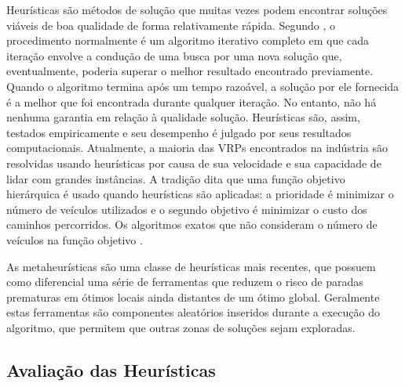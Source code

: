 Heurísticas são métodos de solução que muitas vezes podem encontrar soluções viáveis de boa qualidade de forma relativamente rápida. Segundo \cite{hillier05}, o procedimento normalmente é um algoritmo iterativo completo em que cada iteração envolve a condução de uma busca por uma nova solução que, eventualmente, poderia superar o melhor resultado encontrado previamente. Quando o algoritmo termina após um tempo razoável, a solução por ele fornecida é a melhor que foi encontrada durante qualquer iteração. No entanto, não há nenhuma garantia em relação à qualidade solução. Heurísticas são, assim, testados empiricamente e seu desempenho é julgado por seus resultados computacionais. Atualmente, a maioria das VRPs encontrados na indústria são resolvidas usando heurísticas por causa de sua velocidade e sua capacidade de lidar com grandes instâncias. A tradição dita que uma função objetivo hierárquica é usado quando heurísticas são aplicadas: a prioridade é minimizar o número de veículos utilizados e o segundo objetivo é minimizar o custo dos caminhos percorridos. Os algoritmos exatos que não consideram o número de veículos na função objetivo \cite{braysy05}.

As metaheurísticas são uma classe de heurísticas mais recentes, que possuem como diferencial uma série de ferramentas que reduzem o risco de paradas prematuras em ótimos locais ainda distantes de um ótimo global. Geralmente estas ferramentas são componentes aleatórios inseridos durante a execução do algoritmo, que permitem que outras zonas de soluções sejam exploradas.

\subsection{Avaliação das Heurísticas }


